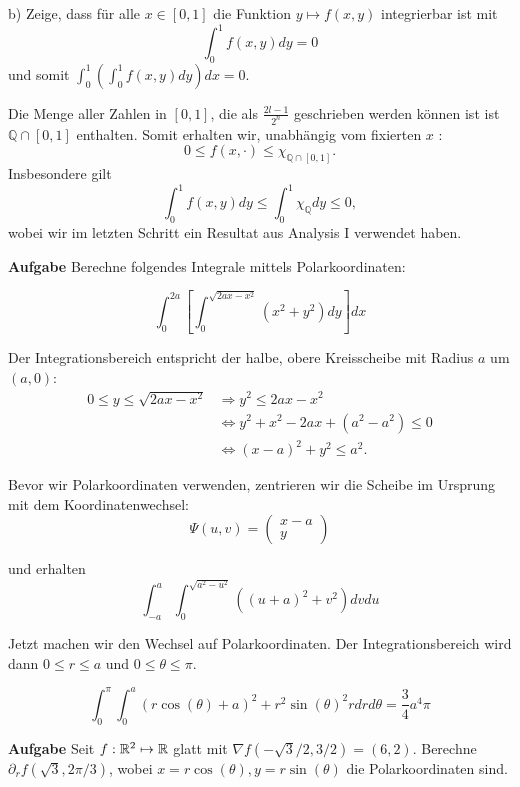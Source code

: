 b) Zeige, dass für alle $x \in[0,1]$ die Funktion $y \mapsto f(x, y)$ integrierbar ist mit
$$
\int_{0}^{1} f(x, y) d y=0
$$
und somit $\int_{0}^{1}\left(\int_{0}^{1} f(x, y) d y\right) d x=0$. \smallskip

Die Menge aller Zahlen in $[0,1]$, die als $\frac{2 l-1}{2^{n}}$ geschrieben werden können ist ist $\mathbb{Q} \cap[0,1]$ enthalten. Somit erhalten wir, unabhängig vom fixierten $x$ :
$$
0 \leq f(x, \cdot) \leq \chi_{\mathbb{Q} \cap[0,1]} .
$$
Insbesondere gilt
$$
\int_{0}^{1} f(x, y) d y \leq \int_{0}^{1} \chi_{\mathbb{Q}} d y \leq 0,
$$
wobei wir im letzten Schritt ein Resultat aus Analysis I verwendet haben. \medskip

\hrulefill

\textbf{Aufgabe} Berechne folgendes Integrale mittels Polarkoordinaten:

$$\int_{0}^{2 a}\left[\int_{0}^{\sqrt{2 a x-x^{2}}}\left(x^{2}+y^{2}\right) d y\right] d x$$

Der Integrationsbereich entspricht der halbe, obere Kreisscheibe mit Radius $a$ um 
$(a, 0)$:
$$
\begin{aligned}
0 \leq y \leq \sqrt{2 a x-x^{2}} & \Longrightarrow y^{2} \leq 2 a x-x^{2} \\
& \Longleftrightarrow y^{2}+x^{2}-2 a x+\left(a^{2}-a^{2}\right) \leq 0 \\
& \Longleftrightarrow(x-a)^{2}+y^{2} \leq a^{2} .
\end{aligned}
$$

Bevor wir Polarkoordinaten verwenden, zentrieren wir die Scheibe im Ursprung mit dem
Koordinatenwechsel:
$$\Psi(u, v)=\begin{pmatrix}
x-a \\
y
\end{pmatrix}$$

und erhalten
$$\int_{-a}^{a} \int_{0}^{\sqrt{a^{2}-u^{2}}}\left((u+a)^{2}+v^{2}\right) dv du$$

Jetzt machen wir den Wechsel auf Polarkoordinaten. Der Integrationsbereich wird dann 
$0 \leq r \leq a$ und $0 \leq \theta \leq \pi$.

$$ \int_{0}^{\pi} \int_{0}^{a}(r \cos (\theta)+a)^{2}+r^{2} \sin (\theta)^{2} r d r d \theta 
=\frac{3}{4} a^{4} \pi $$

\hrulefill

\textbf{Aufgabe} Seit $f: \mathbb{R}^2 \mapsto \mathbb{R}$ glatt mit $\nabla f (-\sqrt{3}/2, 3/2) = (6,2)$. Berechne 
$\partial_r f(\sqrt{3}, 2\pi / 3)$, wobei $x = r \cos(\theta), y = r \sin(\theta)$ die Polarkoordinaten sind. 
\smallskip

